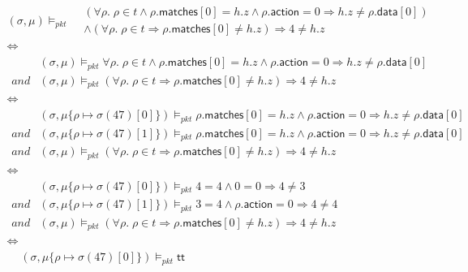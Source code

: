 \documentclass{article}
\newcommand{\pkt}{\mathit{pkt}}
\newcommand{\TRUE}{\mathsf{tt}}
\newcommand{\matches}{\mathsf{matches}}
\newcommand{\action}{\mathsf{action}}
\newcommand{\data}{\mathsf{data}}
\newcommand{\satisfy}[3]{({#1,#3}) \models_{#2}}
\begin{document}
\[
\begin{array}{l}
  \satisfy\sigma\pkt\mu
  \begin{array}{rl}
    &(\forall \rho.\; \rho \in t \wedge \rho.\matches[0] = h.z \wedge \rho.\action = 0
    \Rightarrow h.z \neq \rho.\data[0])\\

    &\wedge (\forall \rho.\;\rho \in t \Rightarrow\rho.\matches[0] \neq h.z) \Rightarrow 4  \neq h.z
  \end{array} \\
  \iff \\
  \begin{array}{rl}
    &\satisfy\sigma\pkt\mu \forall \rho.\; \rho \in t \wedge \rho.\matches[0] = h.z \wedge \rho.\action = 0
    \Rightarrow h.z \neq \rho.\data[0]\\
    \mathit{and}
    &\satisfy\sigma\pkt\mu (\forall \rho.\;\rho \in t \Rightarrow\rho.\matches[0] \neq h.z) \Rightarrow 4  \neq h.z
  \end{array} \\
  \iff\\
  \begin{array}{rl}
    &\satisfy\sigma\pkt{\mu\{\rho \mapsto \sigma(47)[0]\}} \rho.\matches[0] = h.z \wedge \rho.\action = 0
    \Rightarrow h.z \neq \rho.\data[0]\\
    \mathit{and}
  &\satisfy\sigma\pkt{\mu\{\rho \mapsto \sigma(47)[1]\}} \rho.\matches[0] = h.z \wedge   \rho.\action = 0
    \Rightarrow h.z \neq \rho.\data[0]\\
    \mathit{and}
    &\satisfy\sigma\pkt\mu (\forall \rho.\;\rho \in t \Rightarrow\rho.\matches[0] \neq h.z) \Rightarrow 4  \neq h.z
  \end{array} \\
  \iff \\
  \begin{array}{rl}
    &\satisfy\sigma\pkt{\mu\{\rho \mapsto \sigma(47)[0]\}} 4 = 4 \wedge 0 = 0
    \Rightarrow 4 \neq 3\\
    \mathit{and}
  &\satisfy\sigma\pkt{\mu\{\rho \mapsto \sigma(47)[1]\}} 3 = 4 \wedge \rho.\action = 0
    \Rightarrow 4 \neq 4\\
    \mathit{and}
    &\satisfy\sigma\pkt\mu (\forall \rho.\;\rho \in t \Rightarrow\rho.\matches[0] \neq h.z) \Rightarrow 4  \neq h.z
  \end{array} \\
  \iff \\
  \begin{array}{rl}
    &\satisfy\sigma\pkt{\mu\{\rho \mapsto \sigma(47)[0]\}}\TRUE \\

\end{array}
\end{array}\]
\end{document}
